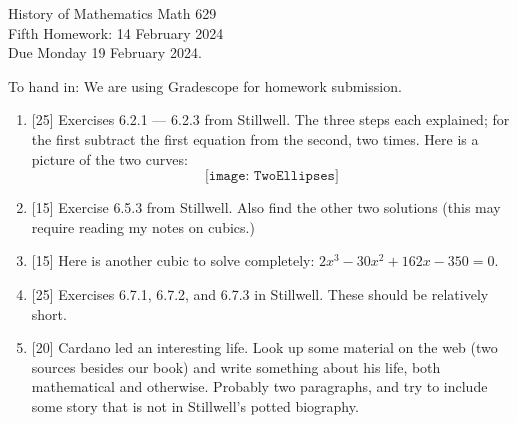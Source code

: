 \documentclass[12pt]{article}
\begin{document}
\LARGE 
\noindent
{\color{Maroon}History of Mathematics \hfill Math 629}\vspace{2pt}\\
\large
Fifth Homework: \hfill 14 February 2024\\
Due Monday 19 February 2024.
\normalsize\vspace{10pt}

To hand in: We are using Gradescope for homework submission.


\begin{enumerate}

\item  {[25]}
  Exercises 6.2.1 --- 6.2.3 from Stillwell.
  The three steps each explained; for the first subtract the first equation from the second, two times.
  Here is a picture of the two curves:
  \[  \texttt{[image: TwoEllipses]}  \]

   \item  {[15]}
     Exercise  6.5.3 from Stillwell.
    Also find the other two solutions (this may require reading my notes on cubics.)

  \item  {[15]}
    Here is another cubic to solve completely: %
       $2x^3-30x^2+162x-350=0$.
 
  \item  {[25]}
    Exercises 6.7.1, 6.7.2, and 6.7.3 in Stillwell. These should be relatively short.

  \item  {[20]}
    Cardano led an interesting life.
    Look up some material on the web (two sources besides our book) and write something about his life, both mathematical
    and otherwise.
    Probably two paragraphs, and try to include some story that is not in Stillwell's potted biography. 
\end{enumerate}
\end{document}
